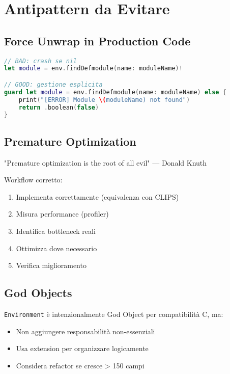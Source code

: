 \section{Antipattern da Evitare}

\subsection{Force Unwrap in Production Code}

\begin{lstlisting}[language=Swift]
// BAD: crash se nil
let module = env.findDefmodule(name: moduleName)!

// GOOD: gestione esplicita
guard let module = env.findDefmodule(name: moduleName) else {
    print("[ERROR] Module \(moduleName) not found")
    return .boolean(false)
}
\end{lstlisting}

\subsection{Premature Optimization}

\begin{warningbox}
"Premature optimization is the root of all evil" --- Donald Knuth
\end{warningbox}

Workflow corretto:
\begin{enumerate}
\item Implementa correttamente (equivalenza con CLIPS)
\item Misura performance (profiler)
\item Identifica bottleneck reali
\item Ottimizza dove necessario
\item Verifica miglioramento
\end{enumerate}

\subsection{God Objects}

\texttt{Environment} è intenzionalmente God Object per compatibilità C, ma:

\begin{itemize}
\item Non aggiungere responsabilità non-essenziali
\item Usa extension per organizzare logicamente
\item Considera refactor se cresce > 150 campi
\end{itemize}

